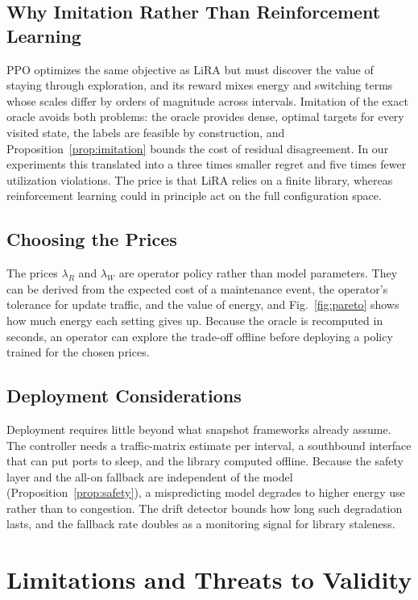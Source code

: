 \documentclass[journal]{IEEEtran}
\begin{document}
\subsection{Why Imitation Rather Than Reinforcement Learning}

PPO optimizes the same objective as LiRA but must discover the value of staying through exploration, and its reward mixes energy and switching terms whose scales differ by orders of magnitude across intervals. Imitation of the exact oracle avoids both problems: the oracle provides dense, optimal targets for every visited state, the labels are feasible by construction, and Proposition~\ref{prop:imitation} bounds the cost of residual disagreement. In our experiments this translated into a three times smaller regret and five times fewer utilization violations. The price is that LiRA relies on a finite library, whereas reinforcement learning could in principle act on the full configuration space.

\subsection{Choosing the Prices}

The prices $\lambda_R$ and $\lambda_W$ are operator policy rather than model parameters. They can be derived from the expected cost of a maintenance event, the operator's tolerance for update traffic, and the value of energy, and Fig.~\ref{fig:pareto} shows how much energy each setting gives up. Because the oracle is recomputed in seconds, an operator can explore the trade-off offline before deploying a policy trained for the chosen prices.

\subsection{Deployment Considerations}

Deployment requires little beyond what snapshot frameworks already assume. The controller needs a traffic-matrix estimate per interval, a southbound interface that can put ports to sleep, and the library computed offline. Because the safety layer and the all-on fallback are independent of the model (Proposition~\ref{prop:safety}), a mispredicting model degrades to higher energy use rather than to congestion. The drift detector bounds how long such degradation lasts, and the fallback rate doubles as a monitoring signal for library staleness.

\section{Limitations and Threats to Validity}\label{sec:limitations}
\end{document}
